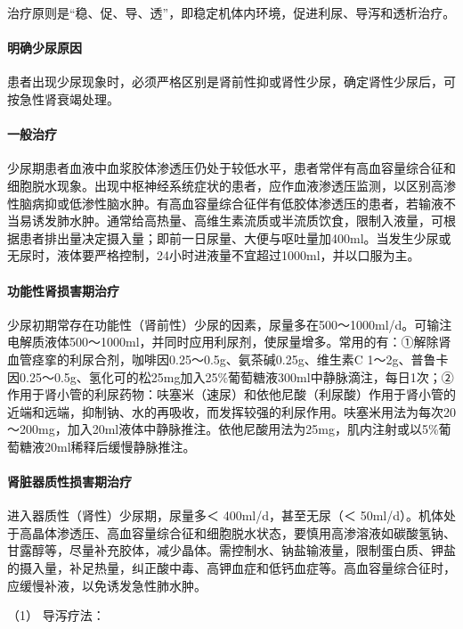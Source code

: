 治疗原则是“稳、促、导、透”，即稳定机体内环境，促进利尿、导泻和透析治疗。

\paragraph{明确少尿原因}

患者出现少尿现象时，必须严格区别是肾前性抑或肾性少尿，确定肾性少尿后，可按急性肾衰竭处理。

\paragraph{一般治疗}

少尿期患者血液中血浆胶体渗透压仍处于较低水平，患者常伴有高血容量综合征和细胞脱水现象。出现中枢神经系统症状的患者，应作血液渗透压监测，以区别高渗性脑病抑或低渗性脑水肿。有高血容量综合征伴有低胶体渗透压的患者，若输液不当易诱发肺水肿。通常给高热量、高维生素流质或半流质饮食，限制入液量，可根据患者排出量决定摄入量；即前一日尿量、大便与呕吐量加400ml。当发生少尿或无尿时，液体要严格控制，24小时进液量不宜超过1000ml，并以口服为主。

\paragraph{功能性肾损害期治疗}

少尿初期常存在功能性（肾前性）少尿的因素，尿量多在500～1000ml/d。可输注电解质液体500～1000ml，并同时应用利尿剂，使尿量增多。常用的有：①解除肾血管痉挛的利尿合剂，咖啡因0.25～0.5g、氨茶碱0.25g、维生素C
1～2g、普鲁卡因0.25～0.5g、氢化可的松25mg加入25\%葡萄糖液300ml中静脉滴注，每日1次；②作用于肾小管的利尿药物：呋塞米（速尿）和依他尼酸（利尿酸）作用于肾小管的近端和远端，抑制钠、水的再吸收，而发挥较强的利尿作用。呋塞米用法为每次20～200mg，加入20ml液体中静脉推注。依他尼酸用法为25mg，肌内注射或以5\%葡萄糖液20ml稀释后缓慢静脉推注。

\paragraph{肾脏器质性损害期治疗}

进入器质性（肾性）少尿期，尿量多＜ 400ml/d，甚至无尿（＜
50ml/d）。机体处于高晶体渗透压、高血容量综合征和细胞脱水状态，要慎用高渗溶液如碳酸氢钠、甘露醇等，尽量补充胶体，减少晶体。需控制水、钠盐输液量，限制蛋白质、钾盐的摄入量，补足热量，纠正酸中毒、高钾血症和低钙血症等。高血容量综合征时，应缓慢补液，以免诱发急性肺水肿。

\hypertarget{text00223.htmlux5cux23CHP7-7-3-3-4-1}{}
（1） 导泻疗法：

